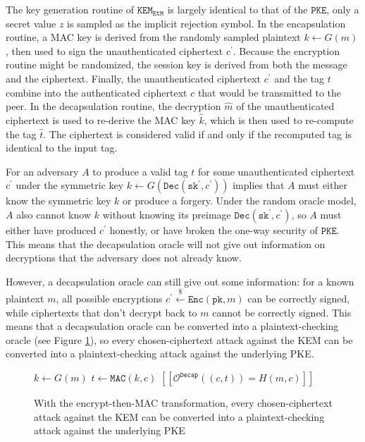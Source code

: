 \documentclass[journal=tches,submission]{iacrtrans}
\newcommand{\pke}{\texttt{PKE}}
\newcommand{\encrypt}{\texttt{Enc}}
\newcommand{\decrypt}{\texttt{Dec}}
\newcommand{\kem}{\texttt{KEM}}
\newcommand{\decap}{\texttt{Decap}}
\newcommand{\etm}{\texttt{EtM}}  %
\newcommand{\mac}{\texttt{MAC}}
\newcommand{\pk}{\texttt{pk}}
\newcommand{\sk}{\texttt{sk}}
\newcommand{\pco}{\texttt{PCO}}
\newcommand{\leftsample}{\stackrel{\$}{\leftarrow}}
\newcommand{\llbrack}{[\![}
\newcommand{\rrbrack}{]\!]}
\begin{document}
The key generation routine of $\kem_\etm$ is largely identical to that of the $\pke$, only a secret value $z$ is sampled as the implicit rejection symbol. In the encapsulation routine, a MAC key is derived from the randomly sampled plaintext $k \leftarrow G(m)$, then used to sign the unauthenticated ciphertext $c^\prime$. Because the encryption routine might be randomized, the session key is derived from both the message and the ciphertext. Finally, the unauthenticated ciphertext $c^\prime$ and the tag $t$ combine into the authenticated ciphertext $c$ that would be transmitted to the peer. In the decapsulation routine, the decryption $\hat{m}$ of the unauthenticated ciphertext is used to re-derive the MAC key $\hat{k}$, which is then used to re-compute the tag $\hat{t}$. The ciphertext is considered valid if and only if the recomputed tag is identical to the input tag.

For an adversary $A$ to produce a valid tag $t$ for some unauthenticated ciphertext $c^\prime$ under the symmetric key $k \leftarrow G(\decrypt(\sk^\prime, c^\prime))$ implies that $A$ must either know the symmetric key $k$ or produce a forgery. Under the random oracle model, $A$ also cannot know $k$ without knowing its preimage $\decrypt(\sk^\prime, c^\prime)$, so $A$ must either have produced $c^\prime$ honestly, or have broken the one-way security of $\pke$. This means that the decapsulation oracle will not give out information on decryptions that the adversary does not already know. 

However, a decapsulation oracle can still give out some information: for a known plaintext $m$, all possible encryptions $c^\prime \leftsample \encrypt(\pk, m)$ can be correctly signed, while ciphertexts that don't decrypt back to $m$ cannot be correctly signed. This means that a decapsulation oracle can be converted into a plaintext-checking oracle (see Figure \ref{fig:pco-using-decap-oracle}), so every chosen-ciphertext attack against the KEM can be converted into a plaintext-checking attack against the underlying PKE.

\begin{figure}[H]
    \centering
    \begin{minipage}{0.6\textwidth}
    \begin{algorithm}[H]
        \caption*{$\pco(m, c)$}
        \begin{algorithmic}[1]
            \State $k \leftarrow G(m)$
            \State $t \leftarrow \mac(k, c)$
            \State \Return $\llbrack \mathcal{O}^\decap((c, t)) = H(m, c)\rrbrack$
        \end{algorithmic}
    \end{algorithm}
    \end{minipage}
    \caption{With the encrypt-then-MAC transformation, every chosen-ciphertext attack against the KEM can be converted into a plaintext-checking attack against the underlying PKE}\label{fig:pco-using-decap-oracle}
\end{figure}
\end{document}
